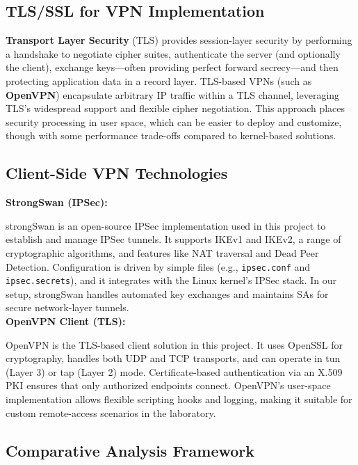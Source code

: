\subsection{TLS/SSL for VPN Implementation}

\textbf{Transport Layer Security} (TLS) provides session-layer security by performing a handshake to negotiate cipher suites, authenticate the server (and optionally the client), exchange keys—often providing perfect forward secrecy—and then protecting application data in a record layer. TLS-based VPNs (such as \textbf{OpenVPN}) encapsulate arbitrary IP traffic within a TLS channel, leveraging TLS’s widespread support and flexible cipher negotiation. This approach places security processing in user space, which can be easier to deploy and customize, though with some performance trade-offs compared to kernel-based solutions.

\subsection{Client-Side VPN Technologies}

\textbf{StrongSwan (IPSec):}

\noindent
strongSwan is an open-source IPSec implementation used in this project to establish and manage IPSec tunnels. It supports IKEv1 and IKEv2, a range of cryptographic algorithms, and features like NAT traversal and Dead Peer Detection. Configuration is driven by simple files (e.g., \texttt{ipsec.conf} and \texttt{ipsec.secrets}), and it integrates with the Linux kernel’s IPSec stack. In our setup, strongSwan handles automated key exchanges and maintains SAs for secure network-layer tunnels.\\

\noindent
\textbf{OpenVPN Client (TLS):}

\noindent
OpenVPN is the TLS-based client solution in this project. It uses OpenSSL for cryptography, handles both UDP and TCP transports, and can operate in tun (Layer 3) or tap (Layer 2) mode. Certificate-based authentication via an X.509 PKI ensures that only authorized endpoints connect. OpenVPN’s user-space implementation allows flexible scripting hooks and logging, making it suitable for custom remote-access scenarios in the laboratory.

\subsection{Comparative Analysis Framework}

